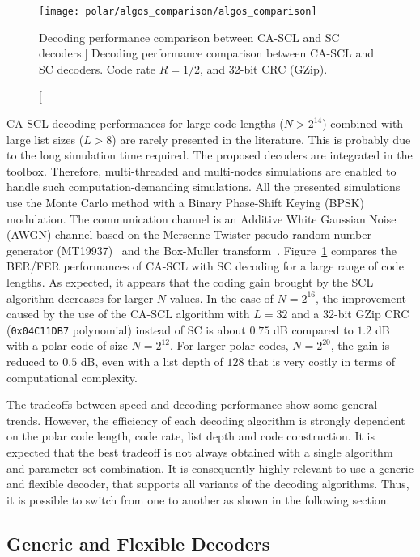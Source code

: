 \begin{figure}[htp]
  \centering
  \texttt{[image: polar/algos\_comparison/algos\_comparison]}
  \caption
    [Decoding performance comparison between CA-SCL and SC decoders.]
    {Decoding performance comparison between CA-SCL and SC decoders.
    Code rate $R = 1/2$, and 32-bit CRC (GZip).}
  \label{plot:alg_polar_algos_comparison}
\end{figure}

CA-SCL decoding performances for large code lengths ($N > 2^{14}$) combined with
large list sizes ($L > 8$) are rarely presented in the literature. This is
probably due to the long simulation time required. The proposed decoders are
integrated in the \AFFECT toolbox. Therefore, multi-threaded and multi-nodes
simulations are enabled to handle such computation-demanding simulations. All
the presented simulations use the Monte Carlo method with a Binary Phase-Shift
Keying (BPSK) modulation. The communication channel is an Additive White
Gaussian Noise (AWGN) channel based on the Mersenne Twister pseudo-random number
generator (MT19937)~\cite{Matsumoto1998} and the Box-Muller
transform~\cite{Box1958}. Figure~\ref{plot:alg_polar_algos_comparison} compares
the BER/FER performances of CA-SCL with SC decoding for a large range of code
lengths. As expected, it appears that the coding gain brought by the SCL
algorithm decreases for larger $N$ values. In the case of $N=2^{16}$, the
improvement caused by the use of the CA-SCL algorithm with $L=32$ and a 32-bit
GZip CRC (\verb|0x04C11DB7| polynomial) instead of SC is about $0.75$ dB
compared to $1.2$ dB with a polar code of size $N=2^{12}$. For larger polar
codes, $N=2^{20}$, the gain is reduced to $0.5$ dB, even with a list depth of
$128$ that is very costly in terms of computational complexity.

The tradeoffs between speed and decoding performance show some general trends.
However, the efficiency of each decoding algorithm is strongly dependent on the
polar code length, code rate, list depth and code construction. It is expected
that the best tradeoff is not always obtained with a single algorithm and
parameter set combination. It is consequently highly relevant to use a generic
and flexible decoder, that supports all variants of the decoding algorithms.
Thus, it is possible to switch from one to another as shown in the following
section.

\subsection{Generic and Flexible Decoders}
\label{sec:alg_polar_generic_flexible}

